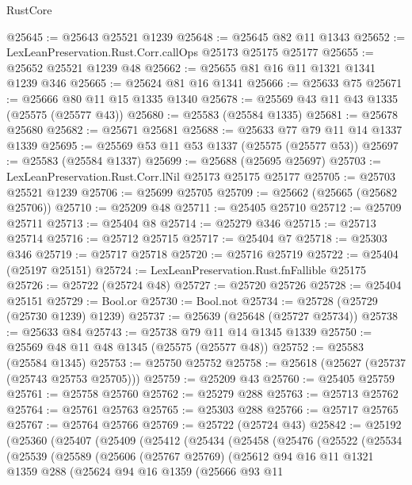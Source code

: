 \begin{lexlean}{RustCore}
\begin{coremodule}
@25645 := @25643 @25521 @1239
@25648 := @25645 @82 @11 @1343
@25652 := LexLeanPreservation.Rust.Corr.callOps @25173 @25175 @25177
@25655 := @25652 @25521 @1239 @48
@25662 := @25655 @81 @16 @11 @1321 @1341 @1239 @346
@25665 := @25624 @81 @16 @1341
@25666 := @25633 @75
@25671 := @25666 @80 @11 @15 @1335 @1340
@25678 := @25569 @43 @11 @43 @1335 (@25575 (@25577 @43))
@25680 := @25583 (@25584 @1335)
@25681 := @25678 @25680
@25682 := @25671 @25681
@25688 := @25633 @77 @79 @11 @14 @1337 @1339
@25695 := @25569 @53 @11 @53 @1337 (@25575 (@25577 @53))
@25697 := @25583 (@25584 @1337)
@25699 := @25688 (@25695 @25697)
@25703 := LexLeanPreservation.Rust.Corr.lNil @25173 @25175 @25177
@25705 := @25703 @25521 @1239
@25706 := @25699 @25705
@25709 := @25662 (@25665 (@25682 @25706))
@25710 := @25209 @48
@25711 := @25405 @25710
@25712 := @25709 @25711
@25713 := @25404 @8
@25714 := @25279 @346
@25715 := @25713 @25714
@25716 := @25712 @25715
@25717 := @25404 @7
@25718 := @25303 @346
@25719 := @25717 @25718
@25720 := @25716 @25719
@25722 := @25404 (@25197 @25151)
@25724 := LexLeanPreservation.Rust.fnFallible @25175
@25726 := @25722 (@25724 @48)
@25727 := @25720 @25726
@25728 := @25404 @25151
@25729 := Bool.or
@25730 := Bool.not
@25734 := @25728 (@25729 (@25730 @1239) @1239)
@25737 := @25639 (@25648 (@25727 @25734))
@25738 := @25633 @84
@25743 := @25738 @79 @11 @14 @1345 @1339
@25750 := @25569 @48 @11 @48 @1345 (@25575 (@25577 @48))
@25752 := @25583 (@25584 @1345)
@25753 := @25750 @25752
@25758 := @25618 (@25627 (@25737 (@25743 @25753 @25705)))
@25759 := @25209 @43
@25760 := @25405 @25759
@25761 := @25758 @25760
@25762 := @25279 @288
@25763 := @25713 @25762
@25764 := @25761 @25763
@25765 := @25303 @288
@25766 := @25717 @25765
@25767 := @25764 @25766
@25769 := @25722 (@25724 @43)
@25842 := @25192
    (@25360
      (@25407
        (@25409
          (@25412
            (@25434
              (@25458
                (@25476
                  (@25522
                    (@25534
                      (@25539
                        (@25589
                          (@25606
                            (@25767 @25769)
                            (@25612
                              @94
                              @16
                              @11
                              @1321
                              @1359
                              @288
                              (@25624
                                @94
                                @16
                                @1359
                                (@25666
                                  @93
                                  @11

\end{coremodule}
\end{lexlean}
